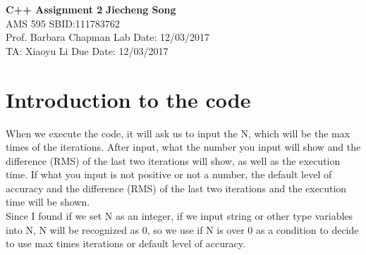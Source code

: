 \documentclass[a4paper, 11pt]{article}
\begin{document}
\noindent
\large\textbf{C++ Assignment 2} \hfill \textbf{Jiecheng Song} \\
\normalsize AMS 595 \hfill SBID:111783762 \\
Prof. Barbara Chapman \hfill Lab Date: 12/03/2017 \\
TA: Xiaoyu Li \hfill Due Date: 12/03/2017

\section*{Introduction to the code
}
When we execute the code, it will ask us to input the N, which will be the max times of the iterations. After input, what the number you input will show and the difference (RMS) of the last two iterations will show, as well as the execution time. If what you input is not positive or not a number, the default level of accuracy and the difference (RMS) of the last two iterations and the execution time will be shown.\\
Since I found if we set N as an integer, if we input string or other type variables into N, N will be recognized as 0, so we use if N is over 0 as a condition to decide to use max times iterations or default level of accuracy.
\end{document}
